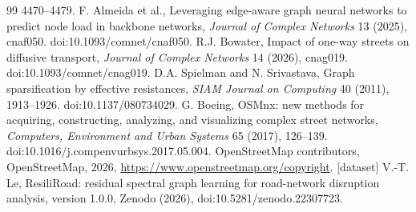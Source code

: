 \documentclass[11pt]{article}
\begin{document}
\begin{thebibliography}{99}
4470--4479.
 F. Almeida et al., Leveraging edge-aware graph neural
networks to predict node load in backbone networks, \emph{Journal of Complex
Networks} 13 (2025), cnaf050. doi:10.1093/comnet/cnaf050.
 R.J. Bowater, Impact of one-way streets on diffusive
transport, \emph{Journal of Complex Networks} 14 (2026), cnag019.
doi:10.1093/comnet/cnag019.
 D.A. Spielman and N. Srivastava, Graph sparsification by
effective resistances, \emph{SIAM Journal on Computing} 40 (2011), 1913--1926.
doi:10.1137/080734029.
 G. Boeing, OSMnx: new methods for acquiring, constructing,
analyzing, and visualizing complex street networks, \emph{Computers,
Environment and Urban Systems} 65 (2017), 126--139.
doi:10.1016/j.compenvurbsys.2017.05.004.
 OpenStreetMap contributors, OpenStreetMap, 2026,
\url{https://www.openstreetmap.org/copyright}.
 [dataset] V.-T. Le, ResiliRoad: residual spectral graph learning for
road-network disruption analysis, version 1.0.0, Zenodo (2026),
doi:10.5281/zenodo.22307723.
\end{thebibliography}
\end{document}
